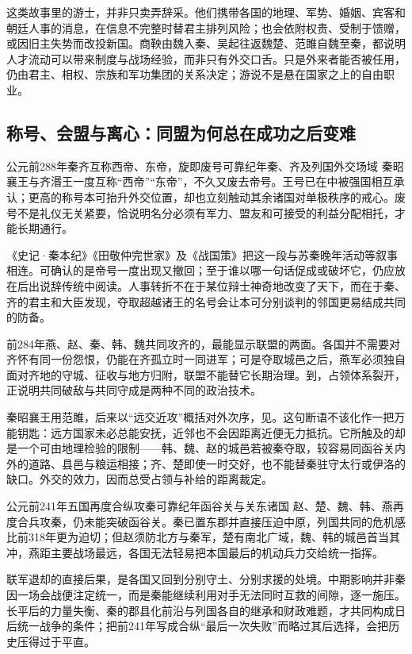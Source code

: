 这类故事里的游士，并非只卖弄辞采。他们携带各国的地理、军势、婚姻、宾客和朝廷人事的消息，在信息不完整时替君主排列风险；也会依附权贵、受制于馈赠，或因旧主失势而改投新国。商鞅由魏入秦、吴起往返魏楚、范雎自魏至秦，都说明人才流动可以带来制度与战场经验，而非只有外交口舌。只是外来者能否被任用，仍由君主、相权、宗族和军功集团的关系决定；游说不是悬在国家之上的自由职业。

\subsection{称号、会盟与离心：同盟为何总在成功之后变难}

\begin{event}{公元前288年}{秦齐互称西帝、东帝，旋即废号}{可靠纪年}{秦、齐及列国外交场域}
秦昭襄王与齐湣王一度互称“西帝”“东帝”，不久又废去帝号。王号已在中被强国相互承认；更高的称号本可抬升外交位置，却也立刻触动其余诸国对单极秩序的戒心。废号不是礼仪无关紧要，恰说明名分必须有军力、盟友和可接受的利益分配相托，才能长期通行。

《史记·秦本纪》《田敬仲完世家》及《战国策》把这一段与苏秦晚年活动等叙事相连。可确认的是帝号一度出现又撤回；至于谁以哪一句话促成或破坏它，仍应放在后出说辞传统中阅读。人事转折不在于某位辩士神奇地改变了天下，而在于秦、齐的君主和大臣发现，夺取超越诸王的名号会让本可分别谈判的邻国更易结成共同的防备。
\end{event}

前284年燕、赵、秦、韩、魏共同攻齐的，最能显示联盟的两面。各国并不需要对齐怀有同一份怨恨，仍能在齐孤立时一同进军；可是夺取城邑之后，燕军必须独自面对齐地的守城、征收与地方归附，联盟不能替它长期治理。到，占领体系裂开，正说明共同破敌与共同守成是两种不同的政治技术。

秦昭襄王用范雎，后来以“远交近攻”概括对外次序，见。这句断语不该化作一把万能钥匙：远方国家未必总能安抚，近邻也不会因距离近便无力抵抗。它所触及的却是一个可由地理检验的限制——韩、魏、赵的城邑若被秦夺取，较容易同函谷关内外的道路、县邑与粮运相接；齐、楚即使一时交好，也不能替秦驻守太行或伊洛的缺口。外交的效力，因而总受占领与补给的距离裁定。

\begin{event}{公元前241年}{五国再度合纵攻秦}{可靠纪年}{函谷关与关东诸国}
赵、楚、魏、韩、燕再度合兵攻秦，仍未能突破函谷关。秦已置东郡并直接压迫中原，列国共同的危机感比前318年更为迫切；但赵须防北方与秦军，楚有南北广域，魏、韩的城邑首当其冲，燕距主要战场最远，各国无法轻易把本国最后的机动兵力交给统一指挥。

联军退却的直接后果，是各国又回到分别守土、分别求援的处境。中期影响并非秦因一场会战便注定统一，而是秦能继续利用对手无法同时互救的间隙，逐一施压。长平后的力量失衡、秦的郡县化前沿与列国各自的继承和财政难题，才共同构成日后统一战争的条件；把前241年写成合纵“最后一次失败”而略过其后选择，会把历史压得过于平直。
\end{event}

